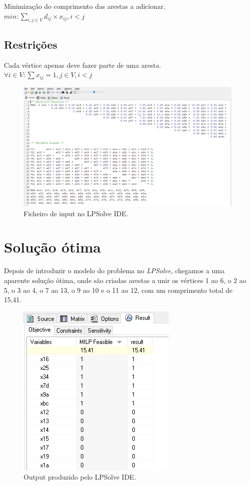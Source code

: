 \documentclass{article}
\begin{document}
Minimização do comprimento das arestas a adicionar.\\
\(min: \sum_{i,j \in V} d_{ij} \times x_{ij}, i < j\)

\subsection{Restrições}

Cada vértice apenas deve fazer parte de uma aresta.\\
\(\forall i \in V: \sum x_{ij} = 1, j \in V, i < j\)

\begin{figure}[H]
    \centering
    \includegraphics[width=0.8\linewidth]{lpsolve1.png}
    \caption{Ficheiro de input no LPSolve IDE.}
    \label{fig:lp}
\end{figure}

\section{Solução ótima}

Depois de introduzir o modelo do problema no \emph{LPSolve}, chegamos a uma aparente solução ótima, onde são criadas arestas a unir os vértices 1 ao 6, o 2 ao 5, o 3 ao 4, o 7 ao 13, o 9 ao 10 e o 11 ao 12, com um comprimento total de 15,41. 

\begin{figure}[H]
    \centering
    \includegraphics[width=0.4\linewidth]{lpsolve2.png}
    \caption{Output produzido pelo LPSolve IDE.}
    \label{fig:lpoutput}
\end{figure}
\end{document}
